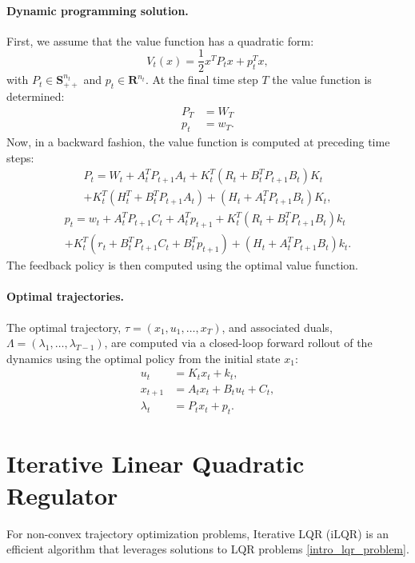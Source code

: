 \paragraph{Dynamic programming solution.}
First, we assume that the value function has a quadratic form:
\begin{equation}
	V_t(x) = \frac{1}{2} x^T P_t x + p_t^T x,
\end{equation}
with $P_t \in \mathbf{S}_{++}^{n_t}$ and $p_t \in \mathbf{R}^{n_t}$. At the final time step $T$ the value function is determined:
\begin{align}
	P_T &= W_T \\
	p_t &= w_T.
\end{align}
Now, in a backward fashion, the value function is computed at preceding time steps: 
\begin{multline}
	P_t = W_t + A_t^T P_{t+1} A_t + K_t^T (R_t + B_t^T P_{t+1} B_t) K_t \\
	+ K_t^T (H_t^T + B_t^T P_{t+1} A_t) + (H_t + A_t^T P_{t+1} B_t) K_t, \label{intro_cost_to_go_matrix}
\end{multline}
\begin{multline}
	p_t = w_t + A_t^T P_{t+1} C_t + A_t^T p_{t+1} + K_t^T (R_t + B_t^T P_{t+1} B_t) k_t \\
	+ K_t^T (r_t + B_t^T P_{t+1} C_t + B_t^T p_{t+1}) + (H_t + A_t^T P_{t+1} B_t) k_t. \label{intro_cost_to_go_vector}
\end{multline}
The feedback policy is then computed using the optimal value function.

\paragraph{Optimal trajectories.}
The optimal trajectory, $\tau = (x_1, u_1, \dots, x_T)$, and associated duals, $\Lambda = (\lambda_1, \dots, \lambda_{T-1})$, are computed via a closed-loop forward rollout of the dynamics using the optimal policy from the initial state $x_1$:
\begin{align}
	u_t &= K_t x_t + k_t, \\
	x_{t+1} &= A_t x_t + B_t u_t + C_t, \\
	\lambda_t &= P_t x_t + p_t.
\end{align}

\section{Iterative Linear Quadratic Regulator}
For non-convex trajectory optimization problems, Iterative LQR (iLQR) is an efficient algorithm that leverages solutions to LQR problems \eqref{intro_lqr_problem}.

